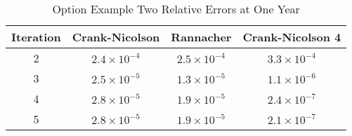 \documentclass[00main.tex]{subfiles}
\begin{document}
\begin{table}
  \centering
  \small
    \begin{tabular}{c|ccc}
    Iteration & Crank-Nicolson & Rannacher & Crank-Nicolson 4 \\ \hline
     2 & $2.4\times 10^{-4}$ & $2.5\times 10^{-4}$ & $3.3\times 10^{-4}$\\
     3 & $2.5\times 10^{-5}$ & $1.3 \times 10^{-5}$ & $1.1\times 10^{-6}$ \\
     4 & $2.8\times 10^{-5}$ & $1.9\times 10^{-5}$ & $2.4\times 10^{-7}$\\
     5 & $2.8\times 10^{-5}$ & $1.9\times 10^{-5}$ & $2.1\times 10^{-7}$ 
    \end{tabular}%
    \caption{Option Example Two Relative Errors at One Year}
  \label{option_ex2_err1}%
\end{table}%
\end{document}
